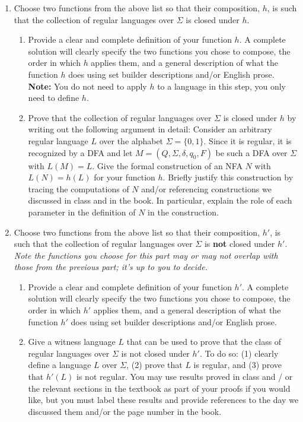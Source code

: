 	
	\begin{enumerate}
		\item Choose two functions from the above list so that their 
		composition, $h$, is such that the collection of regular languages over $\Sigma$ is closed under $h$.
		
		\begin{enumerate}
			\item Provide a clear and complete definition of  your function $h$.
			A complete solution will clearly specify the two functions you chose to compose, 
			the order in which $h$ applies them, and a general description of what the function $h$ does using set builder
			descriptions and/or English prose.
			{\bf Note:} You do not need to apply $h$ to a language in this step, you only need to define $h$.
			\item Prove that the collection of regular languages over $\Sigma$ is 
			closed under $h$ by writing out the following argument in detail: 
			Consider an arbitrary regular language $L$ over the alphabet $\Sigma = \{0, 1\}$.
			Since it is regular, it is recognized by a DFA and let $M = (Q, \Sigma, \delta, q_0, F)$ 
			be such a DFA over $\Sigma$ with $L(M) = L$. 
			Give the formal construction of an NFA $N$ with $L(N) = h(L)$ for your function $h$.
			Briefly justify this construction by tracing the computations of $N$ and/or referencing constructions
			we discussed in class and in the book. In particular, explain the role of each parameter in the definition of $N$ in 
			the construction.
		\end{enumerate}
		
		\item Choose two functions from the above list so that their composition, $h'$, 
		is such that the collection of regular languages over $\Sigma$ is {\bf not} closed under $h'$. 
		{\it Note the functions you choose for this part may or may not overlap with those from the previous part; it's up to you to decide.}
		
		\begin{enumerate}
			\item Provide a clear and complete definition of  your function $h'$.
			A complete solution will clearly specify the two functions you chose to compose, 
			the order in which $h'$ applies them, and a general description of what 
			the function $h'$ does using set builder
			descriptions and/or English prose.			
			\item Give a witness language $L$ that can be used to prove that the class of regular
			languages over $\Sigma$ is not closed under $h'$. To do so: 
			(1) clearly define a language $L$ over $\Sigma$, (2) prove that $L$ is regular, and (3) prove that $h'(L)$ is not regular.
			You may use results proved in class and / or the relevant sections in the textbook as part of your proofs 
			if you would like, but you must label these results and provide references to the day we discussed them and/or the 
			page number in the book.
		\end{enumerate}
	\end{enumerate}
		
